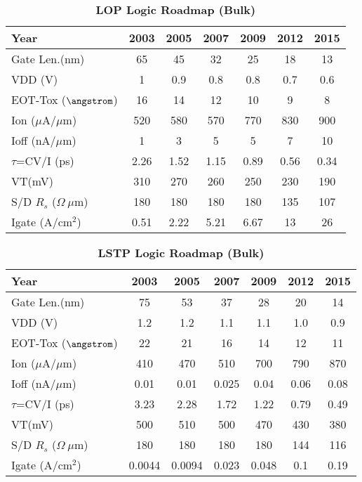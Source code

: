 \documentclass[a4paper, 12pt, twoside, openright]{report}
\begin{document}
  
   \begin{table}[H]
     \centering
     \begin{tabular}{||l||c|c|c|c|c|c||}\hline
      Year          & 2003 & 2005 & 2007 & 2009 & 2012 & 2015\\
    
      \hline       
      Gate Len.(nm)  &65  &45  &32  &25  &18  &13\\ 
      \hline
      VDD (V)  &1  &0.9 &0.8  &0.8  &0.7 &0.6\\
      \hline
      EOT-Tox ($\angstrom$) &16 &14 &12 &10 &9 &8\\
      \hline
        {Ion} ($\mu$A/$\mu$m)  &520  &580 &570 &770 &830 &900\\
      \hline
        {Ioff} (nA/$\mu$m)  &1 &3 &5 &5  &7 &10\\
      \hline
        {$\tau$=CV/I} (ps)  &2.26  &1.52  &1.15 &0.89 &0.56 &0.34\\
      \hline
      VT(mV)   &310  &270 &260 &250 &230 &190\\
      \hline
      S/D $R_s$ ($\Omega~\mu$m)   &180 &180 &180 &180 &135 &107\\
      \hline
      Igate (A/cm$^2$)   &0.51 &2.22 &5.21 &6.67 &13 &26\\
      \hline
     \end{tabular}
     
   \caption{\textbf{LOP Logic Roadmap (Bulk)}}

   \end{table}
 
 
   \begin{table}[H]
     \centering
     \begin{tabular}{||l||c|c|c|c|c|c||}\hline
      Year          & 2003 & 2005 & 2007 & 2009 & 2012 & 2015\\
      \hline
      \hline       
      Gate Len.(nm)  &75 &53  &37  &28  &20  &14\\ 
      \hline
      VDD (V)  &1.2  &1.2 &1.1 &1.1 &1.0 &0.9\\
      \hline
      EOT-Tox ($\angstrom$) &22 &21 &16 &14 &12 &11\\
      \hline
        {Ion} ($\mu$A/$\mu$m)  &410  &470 &510 &700 &790 &870\\
      \hline
        {Ioff} (nA/$\mu$m)  &0.01 &0.01 &0.025 &0.04  &0.06  &0.08\\
      \hline
        {$\tau$=CV/I} (ps)  &3.23 &2.28 &1.72 &1.22 &0.79 &0.49\\
      \hline
      VT(mV)   &500  &510 &500 &470 &430 &380\\
      \hline
      S/D $R_s$ ($\Omega~\mu$m)   &180 &180 &180 &180 &144 &116\\
      \hline
      Igate (A/cm$^2$)   &0.0044 &0.0094 & 0.023 &0.048 &0.1 &0.19\\
      \hline
     \end{tabular}
     \caption{\textbf{LSTP Logic Roadmap (Bulk)}}

   \end{table}
 
\end{document}
